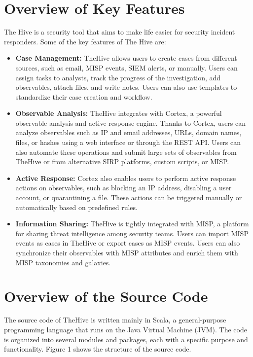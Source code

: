 \documentclass{article}
\begin{document}
\section{Overview of Key Features}

The Hive is a security tool that aims to make life easier for security incident responders. Some of the key features of The Hive are:

\begin{itemize}
    \item \textbf{Case Management:} TheHive allows users to create cases from different sources, such as email, MISP events, SIEM alerts, or manually. Users can assign tasks to analysts, track the progress of the investigation, add observables, attach files, and write notes. Users can also use templates to standardize their case creation and workflow.

    \item \textbf{Observable Analysis:} TheHive integrates with Cortex, a powerful observable analysis and active response engine. Thanks to Cortex, users can analyze observables such as IP and email addresses, URLs, domain names, files, or hashes using a web interface or through the REST API. Users can also automate these operations and submit large sets of observables from TheHive or from alternative SIRP platforms, custom scripts, or MISP.

    \item \textbf{Active Response:} Cortex also enables users to perform active response actions on observables, such as blocking an IP address, disabling a user account, or quarantining a file. These actions can be triggered manually or automatically based on predefined rules.

    \item \textbf{Information Sharing:} TheHive is tightly integrated with MISP, a platform for sharing threat intelligence among security teams. Users can import MISP events as cases in TheHive or export cases as MISP events. Users can also synchronize their observables with MISP attributes and enrich them with MISP taxonomies and galaxies.
\end{itemize}

\section{Overview of the Source Code}

The source code of TheHive is written mainly in Scala, a general-purpose programming language that runs on the Java Virtual Machine (JVM). The code is organized into several modules and packages, each with a specific purpose and functionality. Figure 1 shows the structure of the source code.
\end{document}
